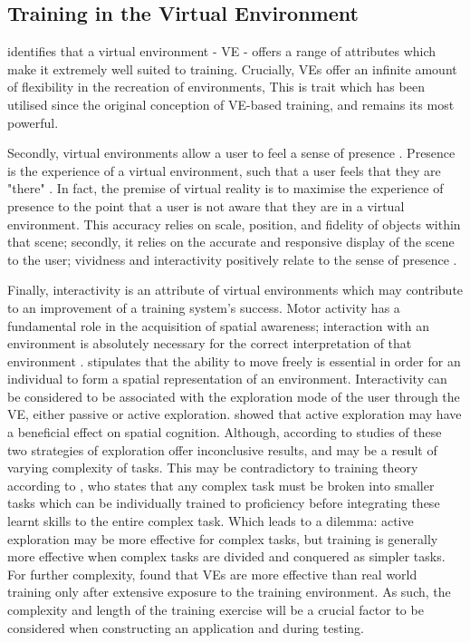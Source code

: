 \documentclass[a4paper, openright, twoside]{report}
\begin{document}
\subsection{Training in the Virtual Environment}
\citet{osberg} identifies that a virtual environment - VE - offers a range of attributes which make it extremely well suited to training. Crucially, VEs offer an infinite amount of flexibility in the recreation of environments, This is trait which has been utilised since the original conception of VE-based training, and remains its most powerful. 

Secondly, virtual environments allow a user to feel a sense of presence \citep{osberg}. Presence is the experience of a virtual environment, such that a user feels that they are "there" \citep{steuer}. In fact, the premise of virtual reality is to maximise the experience of presence to the point that a user is not aware that they are in a virtual environment. This accuracy relies on scale, position, and fidelity  of objects within that scene; secondly, it relies on the accurate and responsive display of the scene to the user; vividness and interactivity positively relate to the sense of presence \citep{steuer}.

Finally, interactivity is an attribute of virtual environments which may contribute to an improvement of a training system's success. Motor activity has a fundamental role in the acquisition of spatial awareness; interaction with an environment is absolutely necessary for the correct interpretation of that environment \citep{siegel}. \cite{osberg} stipulates that the ability to move freely is essential in order for an individual to form a spatial representation of an environment. Interactivity can be considered to be associated with the exploration mode of the user through the VE, either passive or active exploration. \cite{wallet} showed that active exploration may have a beneficial effect on spatial cognition. Although, according to \cite{wallet} studies of these two strategies of exploration offer inconclusive results, and may be a result of varying complexity of tasks. This may be contradictory to training theory according to \cite{goldstein}, who states that any complex task must be broken into smaller tasks which can be individually trained to proficiency before integrating these learnt skills to the entire complex task. Which leads to a dilemma: active exploration may be more effective for complex tasks, but training is generally more effective when complex tasks are divided and conquered as simpler tasks. For further complexity, \cite{waller} found that VEs are more effective than real world training only after extensive exposure to the training environment. As such, the complexity and length of the training exercise will be a crucial factor to be considered when constructing an application and during testing. 
\end{document}
